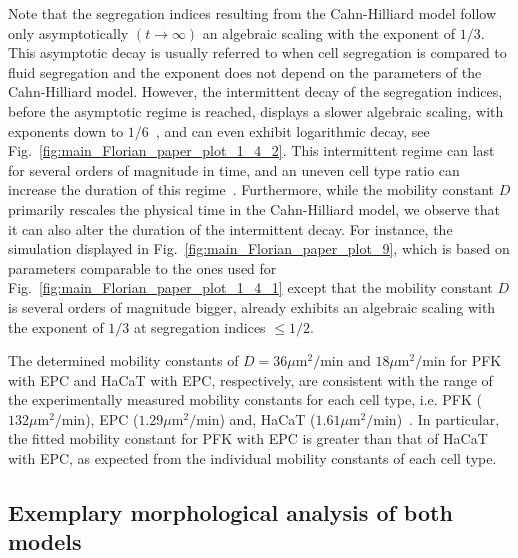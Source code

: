 \documentclass[10pt,letterpaper]{article}
\newcommand{\figref}[1]{Fig.~\ref{fig:#1}}
\begin{document}
Note that the segregation indices resulting from the Cahn-Hilliard
model follow only asymptotically $(t\rightarrow\infty)$ an algebraic scaling
with the exponent of $1/3$. This asymptotic decay is usually referred to when
cell segregation is compared to fluid segregation and the exponent
does not depend on the parameters of the Cahn-Hilliard model. However,
the intermittent decay of the segregation indices, before the
asymptotic regime is reached, displays a slower algebraic scaling,
with exponents down to $1/6$~\cite{GarNieRum2003}, and can even
exhibit logarithmic decay, see
\figref{main_Florian_paper_plot_1_4_2}. This intermittent regime
can last for several orders of magnitude in time, and an uneven cell
type ratio can increase the duration of this
regime~\cite{GarNieRum2003}. Furthermore, while the mobility constant
$D$ primarily rescales the physical time in the Cahn-Hilliard model,
we observe that it can also alter the duration
of the intermittent decay. For instance, the simulation
displayed in \figref{main_Florian_paper_plot_9}, which is based
on parameters comparable to the ones used for
\figref{main_Florian_paper_plot_1_4_1} except that the mobility
constant $D$ is several orders of magnitude bigger, already exhibits
an algebraic scaling with the exponent of $1/3$ at segregation indices
$\leq 1/2$.

The determined mobility constants of $D = 36
\text{$\mu $m}^2/\text{min}$ and $18 \text{$\mu $m}^2/\text{min}$ for
PFK with EPC and HaCaT with EPC, respectively, are consistent with the
range of the experimentally measured mobility constants for each cell
type, i.e. PFK ($132 \text{$\mu $m}^2/\text{min}$), EPC
($1.29 \text{$\mu $m}^2/\text{min}$) and, HaCaT ($1.61
\text{$\mu $m}^2/\text{min}$)~\cite{MehMonNemVic2012}. In particular,
the fitted mobility constant for PFK with EPC is greater than that of
HaCaT with EPC, as expected from the individual mobility constants of
each cell type.

\subsection*{Exemplary morphological analysis of both models}
\end{document}
